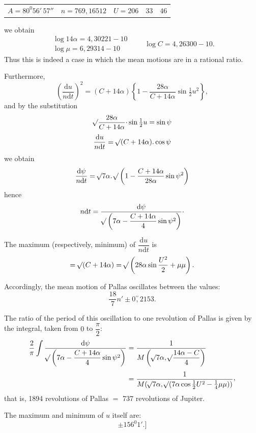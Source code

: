 \begin{landscape}
\begin{center}
\begin{tabular}{@{}lll@{}}
\(A=80^0 56'\,57''\)&\(n=769{,}16512\)&\(U=206\quad33\quad46\)
\end{tabular}
\end{center}
we obtain
\[
\begin{gathered}
\log14\alpha=4{,}30221-10\\
\log\mu=6{,}29314-10
\end{gathered}
\qquad\log C=4{,}26300-10.
\]
Thus this is indeed a case in which the mean motions are in a rational ratio.
\par\noindent\hspace*{\parindent}Furthermore,
\[
\left(\frac{\mathrm{d}u}{n\mathrm{d}t}\right)^2=(C+14\alpha)\left\{1-\frac{28\alpha}{C+14\alpha}\sin\tfrac12u^2\right\},
\]
and by the substitution
\[
\mathord{{}^{}\!\surd}\frac{28\alpha}{C+14\alpha}\mathpunct{\cdot}\sin\tfrac12u=\sin\psi
\]
\[
\frac{\mathrm{d}u}{n\mathrm{d}t}=\mathord{{}^{}\!\surd}(C+14\alpha)\mathpunct{.}\cos\psi
\]
we obtain
\[
\frac{\mathrm{d}\psi}{n\mathrm{d}t}=\mathord{{}^{}\!\surd}7\alpha\mathpunct{.}\mathord{{}^{}\!\surd}\left(1-\frac{C+14\alpha}{28\alpha}\sin\psi^2\right)
\]
hence
\[
n\mathrm{d}t=\frac{\mathrm{d}\psi}{\mathord{{}^{}\!\surd}\left(7\alpha-\dfrac{C+14\alpha}{4}\sin\psi^2\right)}\mathpunct{\cdot}
\]
\par\noindent\hspace*{\parindent}The maximum (respectively, minimum) of \(\dfrac{\mathrm{d}u}{n\mathrm{d}t}\) is
\[
=\mathord{{}^{}\!\surd}(C+14\alpha)=\mathord{{}^{}\!\surd}\left(28\alpha\sin\frac{U^2}{2}+\mu\mu\right).
\]
\par\noindent\hspace*{\parindent}Accordingly, the mean motion of Pallas oscillates between the values:
\[
\frac{18}{7}n'\pm0\overset{\prime\prime}{,}2153.
\]
\par\noindent\hspace*{\parindent}The ratio of the period of this oscillation to one revolution of Pallas is given by the integral, taken from \(0\) to \(\dfrac{\pi}{2}\):
\[
\begin{aligned}
\frac{2}{\pi}\int\frac{\mathrm{d}\psi}{\BareRoot{\left(7\alpha-\dfrac{C+14\alpha}{4}\sin\psi^2\right)}}
&=\frac{1}{M\left(\BareRoot{7\alpha},\BareRoot{\dfrac{14\alpha-C}{4}}\right)}\\[.8ex]
&=\frac{1}{M(\BareRoot{7\alpha},\BareRoot{(7\alpha\cos\tfrac12U^2-\tfrac14\mu\mu)})}\mathpunct{\raisebox{.35ex}{,}}
\end{aligned}
\]
that is, 1894 revolutions of Pallas \(=\) 737 revolutions of Jupiter.
\par\noindent\hspace*{\parindent}The maximum and minimum of \(u\) itself are:
\[
\pm156^0 1'.\text{]}
\]
\clearpage
\endgroup
\end{landscape}
